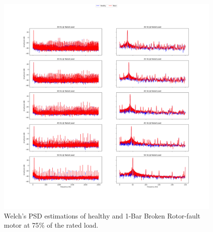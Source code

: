 \pagebreak
\begin{figure}[h]
	\centering
	\includegraphics[width=0.8\paperwidth,keepaspectratio=true]{./fig/psdrotor_75.png}
	\caption{Welch's PSD estimations of healthy and 1-Bar Broken Rotor-fault motor at 75$\%$ of the rated load.}
	\label{psdrotor75}
\end{figure}


 

